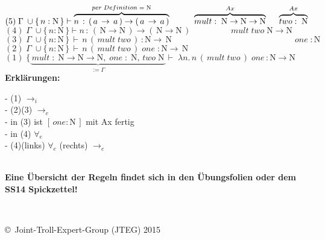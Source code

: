 \documentclass{article}
\begin{document}
	\underline{
		$(5)\;
			\Gamma \;\cup \{\,n:\mathrm{N}\,\} \vdash
			\overbrace{
			n\,:\,(\,a\,\rightarrow\,a\,)\rightarrow (\,a\,\rightarrow \,a\,)
			}^{per\;Definition\; =\;\mathrm{N}}
			\hspace{1cm}
			\overbrace{
			mult:\;\mathrm{N}\rightarrow \mathrm{N}\rightarrow \mathrm{N}
			}^{Ax}
			\hspace{5mm}
			\overbrace{
			two:\;\mathrm{N}
			}^{Ax}
		$
	}\\
	\underline{
		$(4)\;
			\Gamma \;\cup \{\,n:\mathrm{N}\,\} \vdash 
			n\,:\,(\,\mathrm{N}\rightarrow \mathrm{N}\,)
			\rightarrow (\,\mathrm{N}\rightarrow \mathrm{N}\,)
			\hspace{2cm}
			mult\;two\;\mathrm{N}\rightarrow \mathrm{N}
		$
	}\\
	\underline{
	$	(3)\;
		\Gamma \; \cup \{\,n:\mathrm{N}\,\}\,
		\vdash \, n\,(\,mult\;two\,)\,: \mathrm{N}\rightarrow\,\mathrm{N}
		\hspace{6cm}
		\;one\; : \mathrm{N} 
	$
	}\\
	\underline{
	$(2)\;
		\Gamma \; \cup \{\,n:\mathrm{N}\,\}\,
		\vdash \, n\,(\,mult\;two\,)\;one\; : \mathrm{N}\rightarrow\,\mathrm{N}
	$\hspace{48mm}}
	\\
	$	(1)\;
	\{ 
		\underbrace{
			\,mult\;:\;
			\mathrm{N}\rightarrow\mathrm{N}\rightarrow\mathrm{N},\;
			one\; : \; \mathrm{N},\,two\;\mathrm{N}\,
		}_{:=\Gamma}	
	\vdash \; \lambda n.\,n\,(\, mult \; two\,)\;one\,:\mathrm{N}\rightarrow\mathrm{N}
	$		
	\\
	\textbf{Erkl\"arungen:}\\
	\begin{small}
	- (1) $\rightarrow_{i}$\\
	- (2)(3) $\rightarrow_e$\\
	- in (3) ist $[\,one:\mathrm{N}\,]$ mit Ax fertig\\
	- in (4) $\forall _e$\\
	- (4)(links) $\forall_{e}$ (rechts) $\rightarrow_e$\\
	\end{small}	
	\\
	\textbf{Eine \"Ubersicht der Regeln findet sich in den \"Ubungsfolien oder dem SS14 Spickzettel!}
		
		
		
		
		
$ $\\\\
\begin{tiny}
	\copyright\ Joint-Troll-Expert-Group (JTEG) 2015
\end{tiny}
\end{document}
